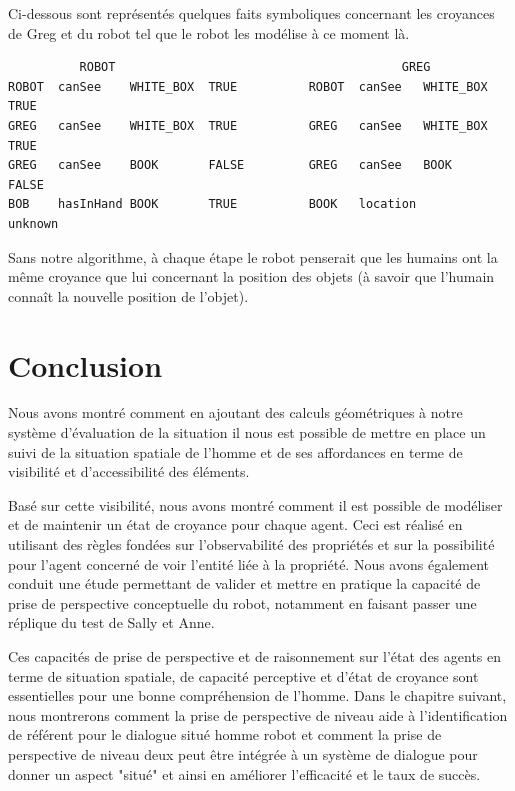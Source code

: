 \documentclass[a4paper,11pt,twoside]{StyleThese}
\begin{document}
Ci-dessous sont représentés quelques faits symboliques concernant les croyances de Greg et du robot tel que le robot les modélise à ce moment là.

\begin{scriptsize}
\begin{verbatim}
          ROBOT                                        GREG
ROBOT  canSee    WHITE_BOX  TRUE          ROBOT  canSee   WHITE_BOX   TRUE    
GREG   canSee    WHITE_BOX  TRUE          GREG   canSee   WHITE_BOX   TRUE
GREG   canSee    BOOK       FALSE         GREG   canSee   BOOK        FALSE
BOB    hasInHand BOOK       TRUE          BOOK   location             unknown
\end{verbatim}
\end{scriptsize}


Sans notre algorithme, à chaque étape le robot penserait que les humains ont la même croyance que lui concernant la position des objets (à savoir que l'humain connaît la nouvelle position de l'objet).


\section{Conclusion}
Nous avons montré comment en ajoutant des calculs géométriques à notre système d'évaluation de la situation il nous est possible de mettre en place un suivi de la situation spatiale de l'homme et de ses affordances en terme de visibilité et d'accessibilité des éléments.

Basé sur cette visibilité, nous avons montré comment il est possible de modéliser et de maintenir un état de croyance pour chaque agent. Ceci est réalisé en utilisant des règles fondées sur l'observabilité des propriétés et sur la possibilité pour l'agent concerné de voir l'entité liée à la propriété.
Nous avons également conduit une étude permettant de valider et mettre en pratique la capacité de prise de perspective conceptuelle du robot, notamment en faisant passer une réplique du test de Sally et Anne.

Ces capacités de prise de perspective et de raisonnement sur l'état des agents en terme de situation spatiale, de capacité perceptive et d'état de croyance sont essentielles pour une bonne compréhension de l'homme.
Dans le chapitre suivant, nous montrerons comment la prise de perspective de niveau aide à l'identification de référent pour le dialogue situé homme robot et comment la prise de perspective de niveau deux peut être intégrée à un système de dialogue pour donner un aspect "situé" et ainsi en améliorer l'efficacité et le taux de succès.
\end{document}
